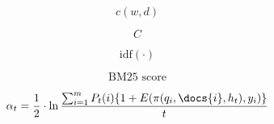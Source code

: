 \begin{definition}
  \[ c(w, d) \]
\end{definition}

\begin{definition}
  \[ C \]
\end{definition}

\begin{definition}
  \[ \text{idf}(\cdot) \]
\end{definition}

\begin{definition}
  \[ \text{BM25 score} \]
\end{definition}

\[
  \alpha_t = \frac{1}{2} \cdot \ln \frac{
    \sum^m_{i=1} P_t(i) \{ 1 + E(\pi(q_i, \docs{i}, h_t), y_i) \}
  }{
    t
  }
\]
